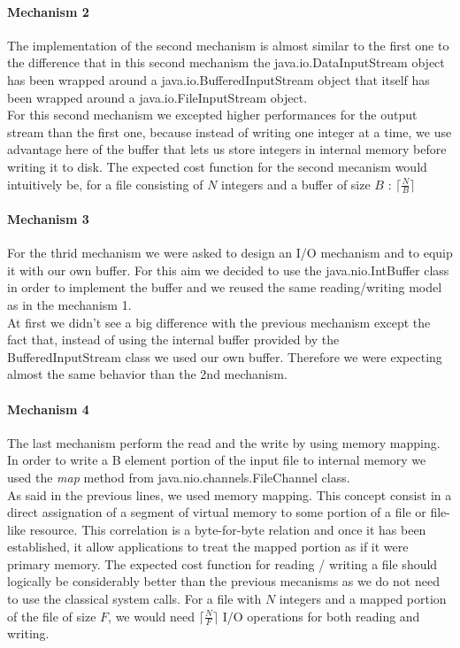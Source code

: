 \documentclass{article}
\begin{document}
    \paragraph{Mechanism 2}  The implementation of the second mechanism is almost similar to the first one to the difference that in this second mechanism the java.io.DataInputStream object has been wrapped around a java.io.BufferedInputStream object that itself has been wrapped around a java.io.FileInputStream object.
    \\
    For this second mechanism we excepted higher performances for the output stream than the first one, because instead of writing one integer at a time, we use advantage here of the buffer that lets us store integers in internal memory before writing it to disk. The expected cost function for the second mecanism would intuitively be, for a file consisting of $N$ integers and a buffer of size $B$ :
    $\lceil \frac{N}{B} \rceil$


    \paragraph{Mechanism 3}
    For the thrid mechanism we were asked to design an I/O mechanism and to equip it with our own buffer. For this aim we decided to use the java.nio.IntBuffer class in order to implement the buffer and we reused the same reading/writing model as in the mechanism 1.
    \\
    At first we didn't see a big difference with the previous mechanism except the fact that, instead of using the internal buffer provided by the BufferedInputStream class we used our own buffer. Therefore we were expecting almost the same behavior than the 2nd mechanism.


    \paragraph{Mechanism 4}  The last mechanism perform the read and the write by using memory mapping. In order to write a B element portion of the input file to internal memory we used the \textit{map} method from java.nio.channels.FileChannel class.\\

    As said in the previous lines, we used memory mapping. This concept consist in a direct assignation of a segment of virtual memory to some portion of a file or file-like resource. This correlation is a byte-for-byte relation and once it has been established, it allow applications to treat the mapped portion as if it were primary memory. The expected cost function for reading / writing a file should logically be considerably better than the previous mecanisms as we do not need to use the classical system calls. For a file with $N$ integers and a mapped portion of the file of size $F$, we would need $\lceil \frac{N}{F} \rceil$ I/O operations for both reading and writing.
\end{document}
